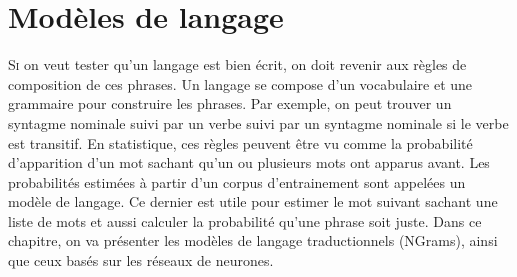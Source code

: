 \documentclass{KodeBook}
\begin{document}
		\mainmatter
	
\fi
\chapter{Modèles de langage}

\begin{introduction}
	\lettrine{S}{i} on veut tester qu'un langage est bien écrit, on doit revenir aux règles de composition de ces phrases.
	Un langage se compose d'un vocabulaire et une grammaire pour construire les phrases.
	Par exemple, on peut trouver un syntagme nominale suivi par un verbe suivi par un syntagme nominale si le verbe est transitif.
	En statistique, ces règles peuvent être vu comme la probabilité d'apparition d'un mot sachant qu'un ou plusieurs mots ont apparus avant. 
	Les probabilités estimées à partir d'un corpus d'entrainement sont appelées un modèle de langage. 
	Ce dernier est utile pour estimer le mot suivant sachant une liste de mots et aussi calculer la probabilité qu'une phrase soit juste.
	Dans ce chapitre, on va présenter les modèles de langage traductionnels (NGrams), ainsi que ceux basés sur les réseaux de neurones.
\end{introduction} 
\end{document}
